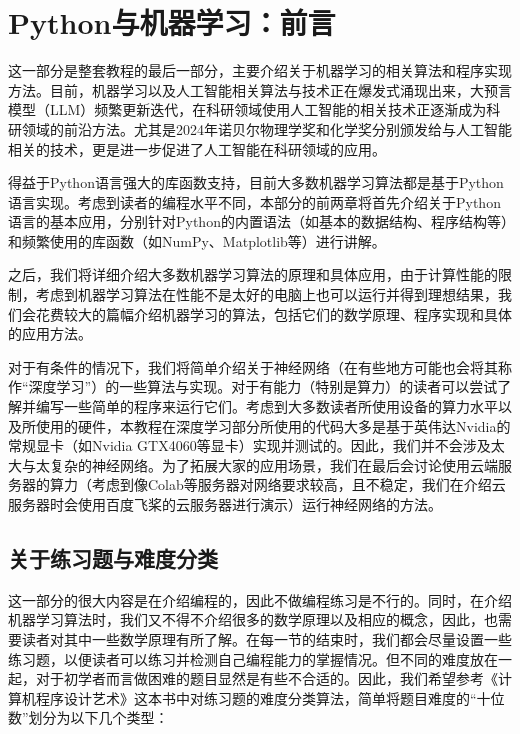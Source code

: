 \chapter*{Python与机器学习：前言}

这一部分是整套教程的最后一部分，主要介绍关于机器学习的相关算法和程序实现方法。目前，机器学习以及人工智能相关算法与技术正在爆发式涌现出来，大预言模型（LLM）频繁更新迭代，在科研领域使用人工智能的相关技术正逐渐成为科研领域的前沿方法。尤其是2024年诺贝尔物理学奖和化学奖分别颁发给与人工智能相关的技术，更是进一步促进了人工智能在科研领域的应用。

得益于Python语言强大的库函数支持，目前大多数机器学习算法都是基于Python语言实现。考虑到读者的编程水平不同，本部分的前两章将首先介绍关于Python语言的基本应用，分别针对Python的内置语法（如基本的数据结构、程序结构等）和频繁使用的库函数（如NumPy、Matplotlib等）进行讲解。

之后，我们将详细介绍大多数机器学习算法的原理和具体应用，由于计算性能的限制，考虑到机器学习算法在性能不是太好的电脑上也可以运行并得到理想结果，我们会花费较大的篇幅介绍机器学习的算法，包括它们的数学原理、程序实现和具体的应用方法。

对于有条件的情况下，我们将简单介绍关于神经网络（在有些地方可能也会将其称作“深度学习”）的一些算法与实现。对于有能力（特别是算力）的读者可以尝试了解并编写一些简单的程序来运行它们。考虑到大多数读者所使用设备的算力水平以及所使用的硬件，本教程在深度学习部分所使用的代码大多是基于英伟达Nvidia的常规显卡（如Nvidia GTX4060等显卡）实现并测试的。因此，我们并不会涉及太大与太复杂的神经网络。为了拓展大家的应用场景，我们在最后会讨论使用云端服务器的算力（考虑到像Colab等服务器对网络要求较高，且不稳定，我们在介绍云服务器时会使用百度飞桨的云服务器进行演示）运行神经网络的方法。

\section*{关于练习题与难度分类}

这一部分的很大内容是在介绍编程的，因此不做编程练习是不行的。同时，在介绍机器学习算法时，我们又不得不介绍很多的数学原理以及相应的概念，因此，也需要读者对其中一些数学原理有所了解。在每一节的结束时，我们都会尽量设置一些练习题，以便读者可以练习并检测自己编程能力的掌握情况。但不同的难度放在一起，对于初学者而言做困难的题目显然是有些不合适的。因此，我们希望参考《计算机程序设计艺术》这本书中对练习题的难度分类算法，简单将题目难度的“十位数”划分为以下几个类型：


